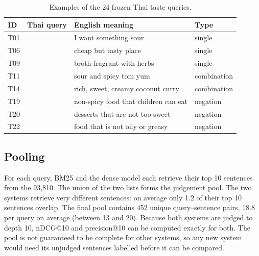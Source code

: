 \begin{table}[H]
\centering\small
\caption{Examples of the 24 frozen Thai taste queries.}
\label{tab:thai-queries}
\begin{tabularx}{\textwidth}{@{}p{1.0cm}p{4.6cm}Lp{1.8cm}@{}}
\toprule
ID & Thai query & English meaning & Type\\
\midrule
T01 &  & I want something sour & single\\
T06 &  & cheap but tasty place & single\\
T09 &  & broth fragrant with herbs & single\\
T11 &  & sour and spicy tom yum & combination\\
T14 &  & rich, sweet, creamy coconut curry & combination\\
T19 &  & non-spicy food that children can eat & negation\\
T20 &  & desserts that are not too sweet & negation\\
T22 &  & food that is not oily or greasy & negation\\
\bottomrule
\end{tabularx}
\end{table}

\subsection{Pooling}
For each query, BM25 and the dense model each retrieve their top 10 sentences from the 93,810.
The union of the two lists forms the judgement pool. The two systems retrieve very different
sentences: on average only 1.2 of their top 10 sentences overlap. The final pool contains 452
unique query--sentence pairs, 18.8 per query on average (between 13 and 20). Because both systems
are judged to depth 10, nDCG@10 and precision@10 can be computed exactly for both. The pool is
not guaranteed to be complete for other systems, so any new system would need its unjudged
sentences labelled before it can be compared.

